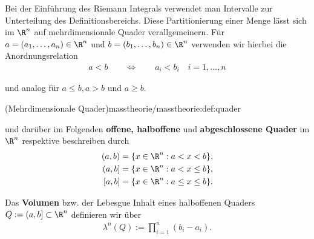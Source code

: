 \documentclass[letterpaper,10pt,english]{jupyterBook}
\begin{document}
\par
Bei der Einführung des Riemann Integrals verwendet man Intervalle zur Unterteilung des Definitionsbereichs.
Diese Partitionierung einer Menge lässt sich im \(\R^n\) auf mehrdimensionale Quader verallgemeinern. Für \(a = (a_1,\ldots,a_n) \in \R^n\) und \(b = (b_1,\ldots,b_n) \in \R^n\) verwenden wir hierbei die Anordnungsrelation
\begin{align*}
a < b \qquad \Leftrightarrow \qquad a_i < b_i \quad i=1,\ldots,n
\end{align*}
\par
und analog für \(a \leq b, a > b\) und \(a \geq b\).
\begin{definition}{(Mehrdimensionale Quader)}{masstheorie/masstheorie:def:quader}



\par
und darüber im Folgenden \textbf{offene, halboffene} und \textbf{abgeschlossene Quader} im \(\R^n\) respektive beschreiben durch
\begin{align*}
(a,b) &= \lbrace x \in \R^n : a < x < b \rbrace,\\
(a,b] &= \lbrace x \in \R^n : a < x \leq b \rbrace,\\
[a,b] &= \lbrace x \in \R^n : a \leq x \leq b \rbrace.
\end{align*}
\par
Das \textbf{Volumen} bzw. der Lebesgue Inhalt eines halboffenen Quaders \(Q := (a,b] \subset \R^n\) definieren wir über
\begin{align*}
\lambda^n(Q) := \prod_{i=1}^n (b_i - a_i).
\end{align*}\end{definition}
\end{document}
